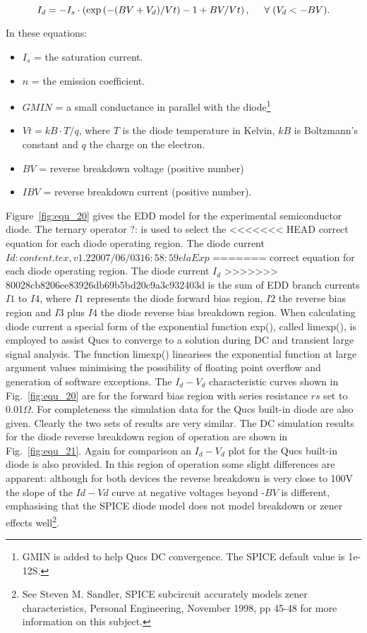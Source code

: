 \begin{equation}
 I_{d} = -I_{s}\cdot \left( \exp\left(-(BV+V_{d})/Vt\right)-1+BV/Vt\right), \hspace{5mm} \forall\; (V_{d } < -BV).
\end{equation} 

\vspace{3mm}

In these equations:
\begin{itemize}
 \item $I_{s}$ = the saturation current.
 \item $n$ = the emission coefficient.
 \item $GMIN$ = a small conductance in parallel with the diode\footnote{GMIN is added to help Qucs DC convergence. The SPICE default value is 1e-12S.}
 \item $Vt = kB\cdot T/q$, where $T$ is the diode temperature in Kelvin, $kB$ is Boltzmann's constant and $q$ the charge on the electron.
 \item $BV$ = reverse breakdown voltage (positive number) 
 \item $IBV$ = reverse breakdown current (positive number).
\end{itemize}

Figure~\ref{fig:equ_20} gives the EDD model for the experimental
semiconductor diode. The ternary operator ?: is used to select the
<<<<<<< HEAD
correct equation for each diode operating region. The diode current $Id: content.tex,v 1.2 2007/06/03 16:58:59 ela Exp $
=======
correct equation for each diode operating region. The diode current $I_d$
>>>>>>> 80028cb8206ee83926db69b5bd20c9a3c932403d
is the sum of EDD branch currents $I1$ to $I4$, where $I1$ represents the
diode forward bias region, $I2$ the reverse bias region and $I3$ plus $I4$
the diode reverse bias breakdown region. When calculating diode
current a special form of the exponential function exp(), called
limexp(), is employed to assist Qucs to converge to a solution during
DC and transient large signal analysis. The function limexp()
linearises the exponential function at large argument values
minimising the possibility of floating point overflow and generation
of software exceptions. The $I_{d}-V_{d}$ characteristic curves shown
in Fig.~\ref{fig:equ_20} are for the forward bias region with series
resistance $rs$ set to 0.01$\Omega$. For completeness the simulation
data for the Qucs built-in diode are also given. Clearly the two sets
of results are very similar. The DC simulation results for the diode
reverse breakdown region of operation are shown in
Fig.~\ref{fig:equ_21}. Again for comparison an $I_{d}-V_{d}$ plot for
the Qucs built-in diode is also provided. In this region of operation
some slight differences are apparent: although for both devices the
reverse breakdown is very close to 100V the slope of the $Id-Vd$ curve
at negative voltages beyond -$BV$ is different, emphasising that the
SPICE diode model does not model breakdown or zener effects
well\footnote{See Steven M. Sandler, SPICE subcircuit accurately
models zener characteristics, Personal Engineering, November 1998, pp
45-48 for more information on this subject.}.

